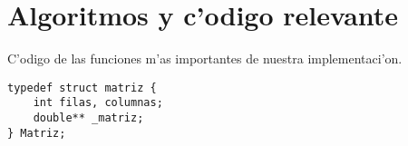 \section{Algoritmos y c'odigo relevante}\label{imple}
C'odigo de las funciones m'as importantes de nuestra implementaci'on.

\lstset{
	basicstyle=\small,
	showstringspaces=false,
 	language=c,
	keywordstyle=\bfseries,
	stringstyle=\ttfamily,
	tabsize=4
	}

\begin{lstlisting}
typedef struct matriz {
	int filas, columnas;
	double** _matriz;
} Matriz;
\end{lstlisting}

